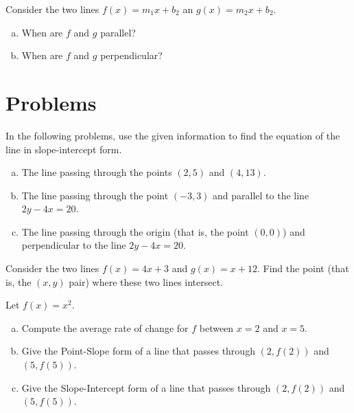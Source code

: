\documentclass[12pt]{amsart}
\begin{document}
\begin{thm}[2 Points]
  Consider the two lines $f(x) = m_1x + b_2$ an $g(x) = m_2x + b_2$.
  \begin{enumerate}[(a)]
  \item
    When are $f$ and $g$ parallel?
    \vspace{1in}
  \item
    When are $f$ and $g$ perpendicular?
    \vspace{1in}
  \end{enumerate}
\end{thm}

\newpage
\section{Problems}

\begin{thm}[16 Points]\label{ex5}
  In the following problems, use the given information to find the equation of the line in slope-intercept form.
  \begin{enumerate}[(a)]
  \item
    The line passing through the points $(2,5)$ and $(4,13)$.
    \vspace{1in}
  \item
    The line passing through the point $(-3, 3)$ and parallel to the line $2y - 4x = 20$.
    \vspace{1in}
  \item
    The line passing through the origin (that is, the point $(0,0)$) and perpendicular to the line $2y - 4x = 20$.
    \vspace{1in}
  \end{enumerate}
  \vspace{1in}
\end{thm}


\begin{thm}[16 Points]\label{ex10}
  Consider the two lines $f(x) = 4x + 3$ and $g(x) = x + 12$.
  Find the point (that is, the $(x,y)$ pair) where these two lines intersect.
  \vspace{2in}
\end{thm}

\newpage

\begin{thm}[16 Points]\label{ex9}
  Let $f(x) = x^2$.
  \begin{enumerate}[(a)]
  \item
    Compute the average rate of change for $f$ between $x = 2$ and $x = 5$.
    \vspace{1in}
  \item
    Give the Point-Slope form of a line that passes through $(2, f(2))$ and $(5, f(5))$.
    \vspace{1in}
  \item
    Give the Slope-Intercept form of a line that passes through $(2, f(2))$ and $(5, f(5))$.
    \vspace{1in}
  \end{enumerate}
\end{thm}
\end{document}
